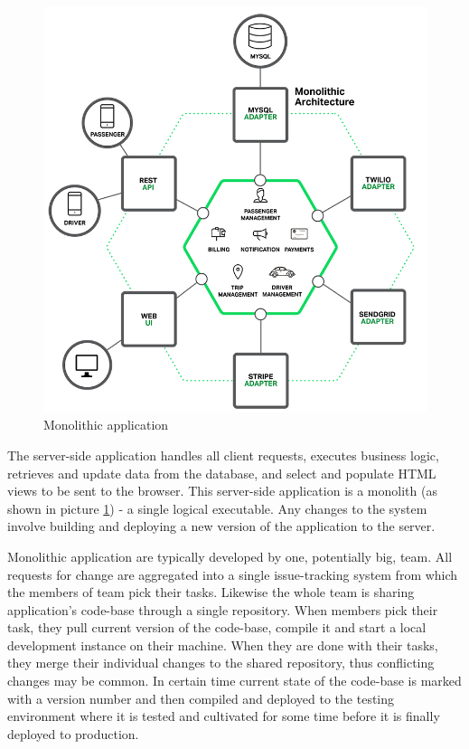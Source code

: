 \documentclass[12pt,oneside]{fithesis2}
\begin{document}
\begin{figure}[ht!]
	\centering
	\includegraphics[width=\textwidth]{images/monolithic_application2.png}
	\caption{Monolithic application\footnotemark}
	\label{monolithic_application}
\end{figure}


The server-side application handles all client requests, executes business logic, retrieves and update data from the database, and select and populate HTML views to be sent to the browser. This server-side application is a monolith (as shown in picture \ref{monolithic_application}) - a single logical executable. Any changes to the system involve building and deploying a new version of the application to the server. \cite{mf}

Monolithic application are typically developed by one, potentially big, team. All requests for change are aggregated into a single issue-tracking system from which the members of team pick their tasks. Likewise the whole team is sharing application's code-base through a single repository. When members pick their task, they pull current version of the code-base, compile it and start a local development instance on their machine. When they are done with their tasks, they merge their individual changes to the shared repository, thus conflicting changes may be common. In certain time current state of the code-base is marked with a version number and then compiled and deployed to the testing environment where it is tested and cultivated for some time before it is finally deployed to production.
\end{document}
